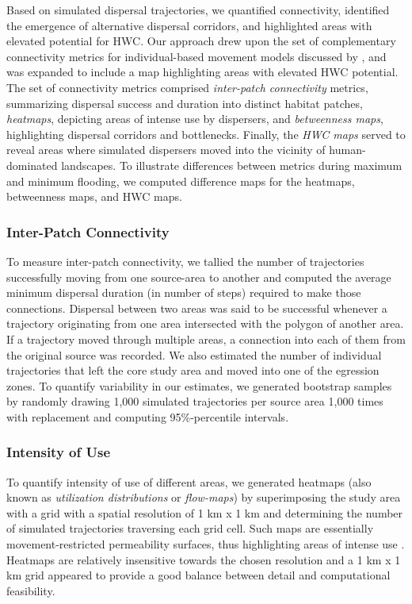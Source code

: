 \documentclass[abstract=on,10pt,a4paper,bibliography=totocnumbered]{article}
\begin{document}
Based on simulated dispersal trajectories, we quantified connectivity,
identified the emergence of alternative dispersal corridors, and highlighted
areas with elevated potential for HWC. Our approach drew upon the set of
complementary connectivity metrics for individual-based movement models
discussed by \citet{Hofmann.2023}, and was expanded to include a map
highlighting areas with elevated HWC potential. The set of connectivity metrics
comprised \textit{inter-patch connectivity} metrics, summarizing dispersal
success and duration into distinct habitat patches, \textit{heatmaps}, depicting
areas of intense use by dispersers, and \textit{betweenness maps}, highlighting
dispersal corridors and bottlenecks. Finally, the \textit{HWC maps} served to
reveal areas where simulated dispersers moved into the vicinity of
human-dominated landscapes. To illustrate differences between metrics during
maximum and minimum flooding, we computed difference maps for the heatmaps,
betweenness maps, and HWC maps.

\subsubsection{Inter-Patch Connectivity}

To measure inter-patch connectivity, we tallied the number of trajectories
successfully moving from one source-area to another and computed the average
minimum dispersal duration (in number of steps) required to make those
connections. Dispersal between two areas was said to be successful whenever a
trajectory originating from one area intersected with the polygon of another
area. If a trajectory moved through multiple areas, a connection into each of
them from the original source was recorded. We also estimated the number of
individual trajectories that left the core study area and moved into one of the
egression zones. To quantify variability in our estimates, we generated
bootstrap samples by randomly drawing 1,000 simulated trajectories per source
area 1,000 times with replacement and computing 95\%-percentile intervals.

\subsubsection{Intensity of Use}

To quantify intensity of use of different areas, we generated heatmaps (also
known as \textit{utilization distributions} or \textit{flow-maps}) by
superimposing the study area with a grid with a spatial resolution of 1 km x 1
km and determining the number of simulated trajectories traversing each grid
cell. Such maps are essentially movement-restricted permeability surfaces, thus
highlighting areas of intense use \citep{Signer.2017, Potts.2023, Hofmann.2023}.
Heatmaps are relatively insensitive towards the chosen resolution and a 1 km x 1
km grid appeared to provide a good balance between detail and computational
feasibility.
\end{document}

